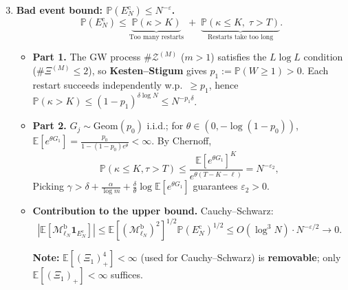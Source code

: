 
\small
\begin{enumerate}
\setcounter{enumi}{2}
\item \textbf{Bad event bound: $\mathbb{P}(E_N^{\mathrm{c}})\le N^{-\varepsilon}$.}
  \[
      \mathbb{P}(E_N^{\mathrm{c}})
      \le
      \underbrace{\mathbb{P}(\kappa>K)}_{\text{Too many restarts}}
      \;+\;
      \underbrace{\mathbb{P}(\kappa\le K,\;\tau>T)}_{\text{Restarts take too long}}.
  \]

  \begin{itemize}
  \item \textbf{Part 1.}
    The GW process $\#\mathcal Z^{(M)}$ ($m>1$) satisfies the $L\log L$ condition
    ($\#\Xi^{(M)}\le 2$), so \textbf{Kesten--Stigum} gives $p_1:=\mathbb{P}(W\ge 1)>0$.
    Each restart succeeds independently w.p.\ $\ge p_1$, hence
    $\mathbb{P}(\kappa>K)\le(1-p_1)^{\delta\log N}\le N^{-p_1\delta}$.

  \item \textbf{Part 2.}
    $G_j\sim\mathrm{Geom}(p_0)$ i.i.d.; for $\theta\in(0,-\log(1-p_0))$,
    $\mathbb{E}[e^{\theta G_1}]=\frac{p_0}{1-(1-p_0)e^\theta}<\infty$.
    By Chernoff,
    \[
        \mathbb{P}(\kappa\le K,\tau>T)
        \le\frac{\mathbb{E}[e^{\theta G_1}]^K}{e^{\theta(T-K-\ell)}}
        =N^{-\varepsilon_2},
    \]
    Picking $\gamma>\delta+\frac{\alpha}{\log m}
    +\frac{\delta}{\theta}\log\mathbb{E}[e^{\theta G_1}]$ guarantees $\varepsilon_2>0$.

  \item \textbf{Contribution to the upper bound.}
    Cauchy--Schwarz:
    \[
        |\mathbb{E}[\mathcal{M}_{\ell_N}^{\mathrm{b}}\mathbf{1}_{E_N^{\mathrm{c}}}]|
        \le\mathbb{E}[(\mathcal{M}_{\ell_N}^{\mathrm{b}})^2]^{1/2}\mathbb{P}(E_N^{\mathrm{c}})^{1/2}
        \le O(\log^3 N)\cdot N^{-\varepsilon/2}\to 0.
    \]

    \textbf{Note:} $\mathbb{E}[(\Xi_1)_+^4]<\infty$ (used for Cauchy--Schwarz) is
    \textbf{removable}; only $\mathbb{E}[(\Xi_1)_+]<\infty$ suffices.
  \end{itemize}
\end{enumerate}
